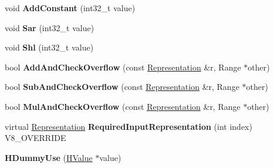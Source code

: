 \begin{DoxyCompactItemize}
\item 
\hypertarget{classv8_1_1internal_1_1_v8___f_i_n_a_l_a1afc1152ca601633b7500839b54740e7}{}void {\bfseries Add\+Constant} (int32\+\_\+t value)\label{classv8_1_1internal_1_1_v8___f_i_n_a_l_a1afc1152ca601633b7500839b54740e7}

\item 
\hypertarget{classv8_1_1internal_1_1_v8___f_i_n_a_l_a3e60cb06edb9c43e10f02229ed217b4b}{}void {\bfseries Sar} (int32\+\_\+t value)\label{classv8_1_1internal_1_1_v8___f_i_n_a_l_a3e60cb06edb9c43e10f02229ed217b4b}

\item 
\hypertarget{classv8_1_1internal_1_1_v8___f_i_n_a_l_a38fcd690aaac9a03a7e7fa78be5d7ac5}{}void {\bfseries Shl} (int32\+\_\+t value)\label{classv8_1_1internal_1_1_v8___f_i_n_a_l_a38fcd690aaac9a03a7e7fa78be5d7ac5}

\item 
\hypertarget{classv8_1_1internal_1_1_v8___f_i_n_a_l_a9914781fda0f7e9f960352979ffa0030}{}bool {\bfseries Add\+And\+Check\+Overflow} (const \hyperlink{classv8_1_1internal_1_1_representation}{Representation} \&r, Range $\ast$other)\label{classv8_1_1internal_1_1_v8___f_i_n_a_l_a9914781fda0f7e9f960352979ffa0030}

\item 
\hypertarget{classv8_1_1internal_1_1_v8___f_i_n_a_l_a1abe86b2f9930bbdb562652033629810}{}bool {\bfseries Sub\+And\+Check\+Overflow} (const \hyperlink{classv8_1_1internal_1_1_representation}{Representation} \&r, Range $\ast$other)\label{classv8_1_1internal_1_1_v8___f_i_n_a_l_a1abe86b2f9930bbdb562652033629810}

\item 
\hypertarget{classv8_1_1internal_1_1_v8___f_i_n_a_l_afee4a9eddbc55ed8446907a2ab27156d}{}bool {\bfseries Mul\+And\+Check\+Overflow} (const \hyperlink{classv8_1_1internal_1_1_representation}{Representation} \&r, Range $\ast$other)\label{classv8_1_1internal_1_1_v8___f_i_n_a_l_afee4a9eddbc55ed8446907a2ab27156d}

\item 
\hypertarget{classv8_1_1internal_1_1_v8___f_i_n_a_l_a6c6d1f37f40b113d8f4062f1ffff7215}{}virtual \hyperlink{classv8_1_1internal_1_1_representation}{Representation} {\bfseries Required\+Input\+Representation} (int index) V8\+\_\+\+O\+V\+E\+R\+R\+I\+D\+E\label{classv8_1_1internal_1_1_v8___f_i_n_a_l_a6c6d1f37f40b113d8f4062f1ffff7215}

\item 
\hypertarget{classv8_1_1internal_1_1_v8___f_i_n_a_l_a20b1b06fee74f9c2cd25e3645180fcc0}{}{\bfseries H\+Dummy\+Use} (\hyperlink{classv8_1_1internal_1_1_h_value}{H\+Value} $\ast$value)\label{classv8_1_1internal_1_1_v8___f_i_n_a_l_a20b1b06fee74f9c2cd25e3645180fcc0}


\end{DoxyCompactItemize}
